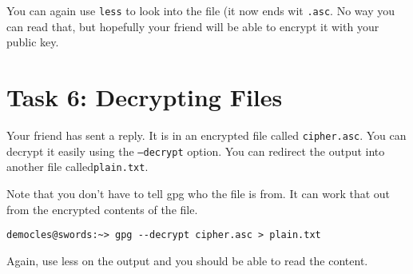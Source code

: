 \documentclass{article}
\begin{document}
You can again use \texttt{less} to look into the file (it now ends wit \texttt{.asc}. No way you can read that, but hopefully your friend will be able to encrypt it with your public key.

\section{Task 6: Decrypting Files}
Your friend has sent a reply. It is in an encrypted file called \texttt{cipher.asc}. You can decrypt it easily using the \texttt{--decrypt} option. You can redirect the output into another file called\texttt{plain.txt}.

Note that you don’t have to tell gpg who the file is from. It can work that out from the encrypted contents of the file.
\begin{verbatim}
democles@swords:~> gpg --decrypt cipher.asc > plain.txt 
\end{verbatim}

Again, use less on the output and you should be able to read the content.
\end{document}
